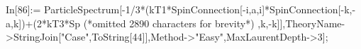 In[86]:= ParticleSpectrum[-1/3*(kT1*SpinConnection[-i,a,i]*SpinConnection[-k,-a,k])+(2*kT3*Sp (*omitted 2890 characters for brevity*) ,k,-k]],TheoryName->StringJoin["Case",ToString[44]],Method->"Easy",MaxLaurentDepth->3];
